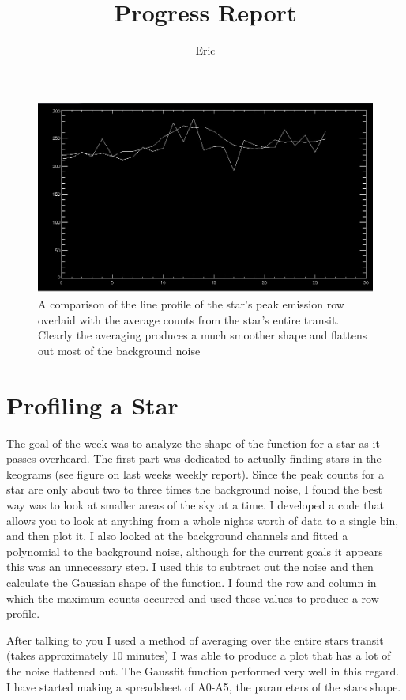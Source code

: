 \documentclass[11pt]{article}
\title{Progress Report}
\author{Eric}
\begin{document}
\maketitle
\medskip

\begin{figure}[h!]
\includegraphics[scale=0.7]{averaging.jpg}
\caption{A comparison of the line profile of the star's peak emission row overlaid with the average counts from the star's entire transit. Clearly the averaging produces a much smoother shape and flattens out most of the background noise}
\end{figure}
\section{Profiling a Star}
\hspace{0.5cm}

The goal of the week was to analyze the shape of the function for a star as it passes overheard. The first part was dedicated to actually finding stars in the keograms (see figure on last weeks weekly report). Since the peak counts for a star are only about two to three times the background noise, I found the best way was to look at smaller areas of the sky at a time. I developed a code that allows you to look at anything from a whole nights worth of data to a single bin, and then plot it. I also looked at the background channels and fitted a polynomial to the background noise, although for the current goals it appears this was an unnecessary step. I used this to subtract out the noise and then calculate the Gaussian shape of the function. I found the row and column in which the maximum counts occurred and used these values to produce a row profile. 

After talking to you I used a method of averaging over the entire stars transit (takes approximately 10 minutes) I was able to produce a plot that has a lot of the noise flattened out. The Gaussfit function performed very well in this regard. I have started making a spreadsheet of A0-A5, the parameters of the stars shape. 
\end{document}
